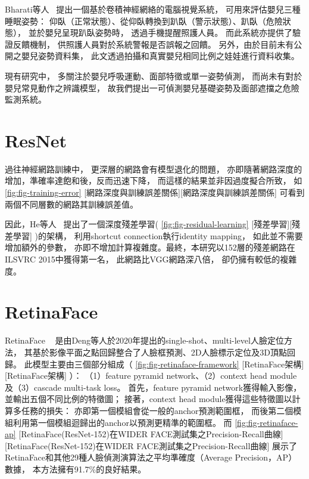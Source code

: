 \documentclass[class=NCU_thesis, crop=false]{standalone}
\begin{document}
Bharati等人~\cite{bharati_efficient_2021}
提出一個基於卷積神經網絡的電腦視覺系統，
可用來評估嬰兒三種睡眠姿勢：
仰臥（正常狀態）、從仰臥轉換到趴臥（警示狀態）、趴臥（危險狀態），
並於嬰兒呈現趴臥姿勢時，
透過手機提醒照護人員。
而此系統亦提供了驗證反饋機制，
供照護人員對於系統警報是否誤報之回饋。
另外，由於目前未有公開之嬰兒姿勢資料集，
此文透過拍攝和真實嬰兒相同比例之娃娃進行資料收集。

現有研究中，
多關注於嬰兒呼吸運動、面部特徵或單一姿勢偵測，
而尚未有對於嬰兒常見動作之辨識模型，
故我們提出一可偵測嬰兒基礎姿勢及面部遮擋之危險監測系統。

\section{ResNet}
過往神經網路訓練中，
更深層的網路會有模型退化的問題，
亦即隨著網路深度的增加，準確率達飽和後，反而迅速下降，
而這樣的結果並非因過度擬合所致，
如\cref{fig:fig-training-error}
[網路深度與訓練誤差關係][網路深度與訓練誤差關係]
可看到兩個不同層數的網路其訓練誤差值。

因此，He等人~\cite{he_deep_2016}
提出了一個深度殘差學習(
\cref{fig:fig-residual-learning}
[殘差學習][殘差學習]
)的架構，
利用shortcut connection執行identity mapping，
如此並不需要增加額外的參數，
亦即不增加計算複雜度。最終，本研究以152層的殘差網路在ILSVRC 2015中獲得第一名，
此網路比VGG網路深八倍，
卻仍擁有較低的複雜度。

\section{RetinaFace}

RetinaFace
~\cite{deng_retinaface_2020}
是由Deng等人於2020年提出的single-shot、multi-level人臉定位方法，
其基於影像平面之點回歸整合了人臉框預測、2D人臉標示定位及3D頂點回歸。
此模型主要由三個部分組成（
\cref{fig:fig-retinaface-framework}
[RetinaFace架構][RetinaFace架構]
）：
（1）feature pyramid network、（2）context head module及（3）cascade multi-task loss。
首先，feature pyramid network獲得輸入影像，並輸出五個不同比例的特徵圖；
接著，context head module獲得這些特徵圖以計算多任務的損失：
亦即第一個模組會從一般的anchor預測範圍框，
而後第二個模組利用第一個模組迴歸出的anchor以預測更精準的範圍框。
而
\cref{fig:fig-retinaface-ap}
[RetinaFace(ResNet-152)在WIDER FACE測試集之Precision-Recall曲線][RetinaFace(ResNet-152)在WIDER FACE測試集之Precision-Recall曲線]
展示了RetinaFace和其他29種人臉偵測演算法之平均準確度（Average Precision，AP）數據，
本方法擁有91.7\%的良好結果。
\end{document}
